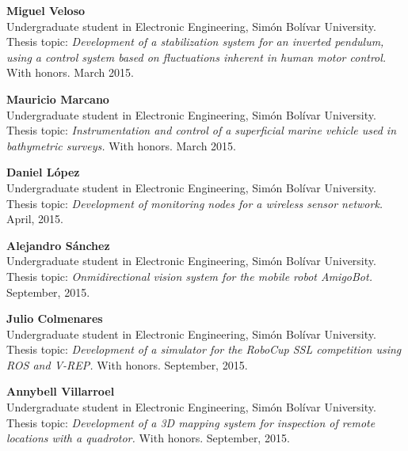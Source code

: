 \documentclass[10pt]{article}
\begin{document}
\begin{bibsection}
    \item \textbf{Miguel Veloso}\\
        Undergraduate student in Electronic Engineering, Simón Bolívar University.\\
        Thesis topic: \textit{Development of a stabilization system for an inverted
        pendulum, using a control system based on fluctuations inherent in human
        motor control.} With honors. March 2015.

    \item \textbf{Mauricio Marcano}\\
        Undergraduate student in Electronic Engineering, Simón Bolívar University.\\
        Thesis topic: \textit{Instrumentation and control of a superficial marine
        vehicle used in bathymetric surveys.} With honors. March 2015.

    \item \textbf{Daniel López}\\
        Undergraduate student in Electronic Engineering, Simón Bolívar University.\\
        Thesis topic: \textit{Development of monitoring nodes for a wireless
        sensor network.} April, 2015.

    \item \textbf{Alejandro Sánchez}\\
        Undergraduate student in Electronic Engineering, Simón Bolívar University.\\
        Thesis topic: \textit{Onmidirectional vision system for the mobile robot
        AmigoBot.} September, 2015.

    \item \textbf{Julio Colmenares}\\
        Undergraduate student in Electronic Engineering, Simón Bolívar University.\\
        Thesis topic: \textit{Development of a simulator for the RoboCup SSL
        competition using ROS and V-REP.} With honors. September, 2015.

     \item \textbf{Annybell Villarroel}\\
        Undergraduate student in Electronic Engineering, Simón Bolívar University.\\
        Thesis topic: \textit{Development of a 3D mapping system for inspection
        of remote locations with a quadrotor.} With honors. September, 2015.


\end{bibsection}
\end{document}
